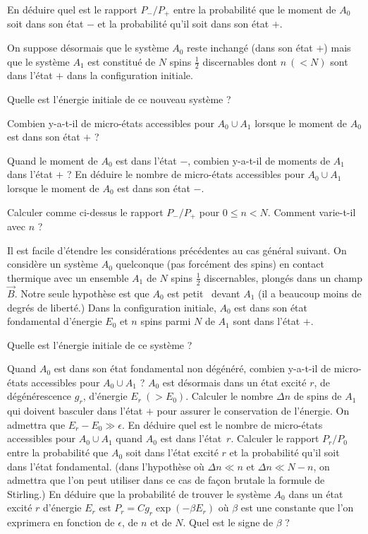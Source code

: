 \documentclass[utf8, 11pt]{feuille}
\begin{document}
\question En déduire quel est le rapport $P_-/P_+$ entre la probabilité que le moment de $A_0$ soit dans son état $-$ et la probabilité qu'il soit dans son état $+$.

\medskip

On suppose désormais que le  système $A_0$ reste inchangé (dans son état $+$) mais que le système $A_1$ est constitué de $N$ spins $\frac{1}{2}$ discernables dont $n \ (< N)$ sont dans l'état $+$ dans la configuration initiale.

\medskip

\question Quelle est l'énergie initiale de ce nouveau système ?

\question Combien y-a-t-il de micro-états accessibles pour $A_0 \cup A_1$ lorsque le moment de $A_0$ est dans son état $+$ ? 

\question Quand le moment de $A_0$ est dans l'état $-$, combien y-a-t-il de moments de $A_1$ dans l'état $+$ ? En déduire le nombre de micro-états accessibles pour $A_0 \cup A_1$ lorsque le moment de $A_0$ est dans son état $-$.

\question Calculer comme ci-dessus le rapport $P_-/P_+$ pour $0 \le n < N$. Comment varie-t-il avec $n$ ?

\medskip

Il est facile d'étendre les considérations précédentes au cas général suivant.  On considère un système $A_0$ quelconque (pas forcément des spins) en contact thermique avec un ensemble $A_1$ de $N$ spins $\frac{1}{2}$ discernables, plongés dans un champ $\vec B$. Notre seule hypothèse est que $A_0$ est \og petit \fg \ devant $A_1$ (il a beaucoup moins de degrés de liberté.) Dans la configuration initiale, $A_0$ est dans son état fondamental d'énergie $E_0$ et $n$ spins parmi $N$ de $A_1$ sont dans l'état $+$.

\medskip

\question Quelle est l'énergie initiale de ce système ?

\question Quand $A_0$ est dans son état fondamental non dégénéré, combien y-a-t-il de micro-états accessibles pour $A_0 \cup A_1$ ?
\question $A_0$ est désormais dans un état excité $r$, de dégénérescence $g_r$, d'énergie $E_r \ (>E_0)$. Calculer le nombre $\Delta n$ de spins de $A_1$ qui doivent basculer dans l'état $+$ pour assurer le conservation de l'énergie. On admettra que $E_r-E_0 \gg \epsilon$. En déduire quel est le nombre de micro-états accessibles pour $A_0 \cup A_1$ quand $A_0$ est dans \mbox{l'état $r$}.
\question Calculer le rapport $P_r/P_0$ entre la probabilité que $A_0$ soit dans l'état excité $r$  et la probabilité qu'il soit dans l'état fondamental. (dans l'hypothèse où $\Delta n \ll n$ et $\Delta n \ll N-n$, on admettra que l'on peut utiliser dans ce cas de façon brutale la formule de Stirling.)
\question En déduire que la probabilité de trouver le système $A_0$ dans un état excité $r$ d'énergie $E_r$ est \mbox{$P_r=C g_r \exp(-\beta E_r)$} où $\beta $ est une constante que l'on exprimera en fonction de $\epsilon$, de $n$ et de $N$. Quel est le signe de $\beta $ ?
\end{document}
